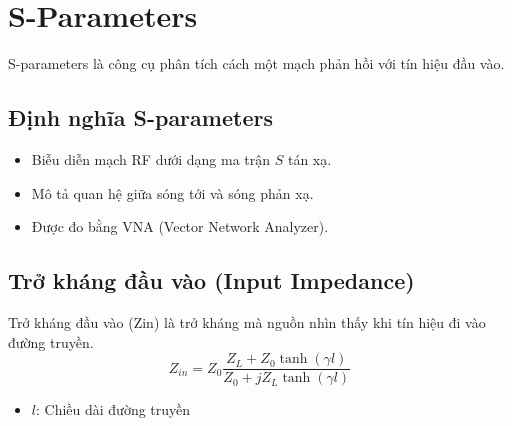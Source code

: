 \chapter{S-Parameters}
    S-parameters là công cụ phân tích cách một mạch phản hồi với tín hiệu đầu vào.

    \section{Định nghĩa S-parameters\cite{cadence2023sparams}}
        \begin{itemize}
            \item Biễu diễn mạch RF dưới dạng ma trận $S$ tán xạ.
            \item Mô tả quan hệ giữa sóng tới và sóng phản xạ.
            \item Được đo bằng VNA (Vector Network Analyzer).
        \end{itemize}

    \section{Trở kháng đầu vào (Input Impedance)}
        Trở kháng đầu vào (Zin) là trở kháng mà nguồn nhìn thấy khi tín hiệu đi vào đường truyền.
        \begin{equation}
            Z_{in} = Z_0 \frac{Z_L + Z_0 \tanh(\gamma l)}{Z_0 + jZ_L \tanh(\gamma l)}
            \label{eq:zin}    
        \end{equation}
        
        \begin{itemize}
            \item $l$: Chiều dài đường truyền
        \end{itemize}

